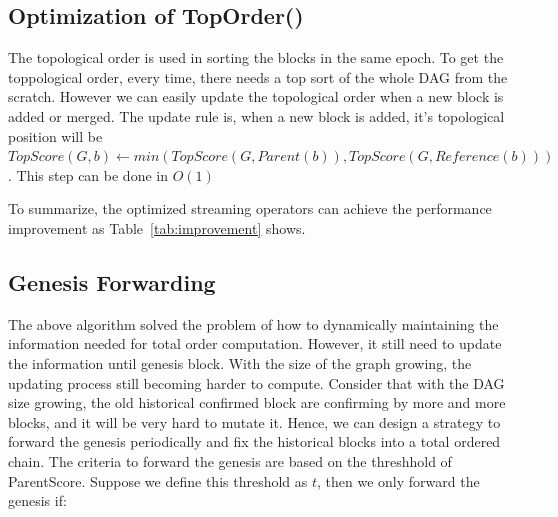 \subsection{Optimization of TopOrder()}
The topological order is used in sorting the blocks in the same epoch.
To get the toppological order, every time, there needs a top sort of the whole DAG from the scratch.
However we can easily update the topological order when a new block is added or merged.
 The update rule is, when a new block is added, it's topological position will be $TopScore(G, b) \gets min(TopScore(G, Parent(b)), TopScore(G, Reference(b)))$. This step can be done in $O(1)$ 


To summarize, the optimized streaming operators can achieve the performance improvement as Table~\ref{tab:improvement} shows. 

\begin{table}[]
\caption {Analysis of Graph properties calculation} \label{tab:improvement}
\begin{center}
\end{center}
\end{table}

\subsection{Genesis Forwarding}
The above algorithm solved the problem of how to dynamically maintaining the information needed for total order computation.
However, it still need to update the information until genesis block. 
With the size of the graph growing, the updating process still becoming harder to compute.
Consider that with the DAG size growing, the old historical confirmed block are confirming by more and more blocks, and it will be very hard to mutate it.
Hence, we can design a strategy to forward the genesis periodically and fix the historical blocks into a total ordered chain.
The criteria to forward the genesis are based on the threshhold of ParentScore.
Suppose we define this threshold as $t$, then we only forward the genesis if: 

